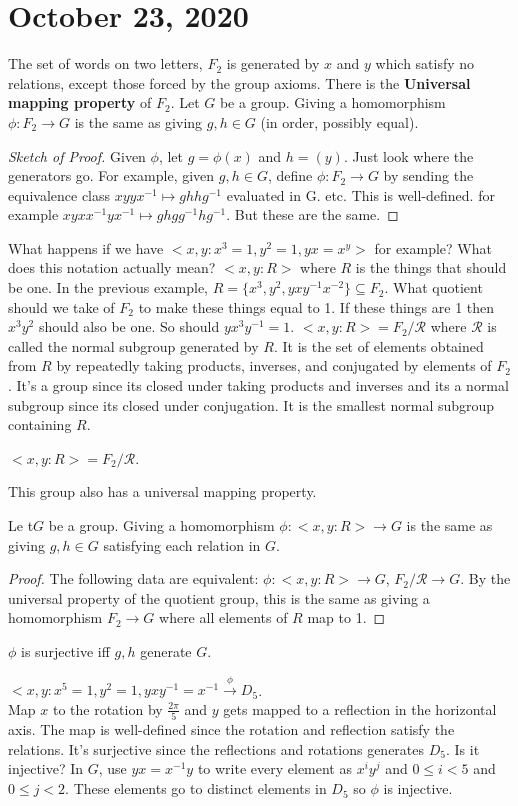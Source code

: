 \documentclass{article}
\newcommand{\vocab}[1]{\textbf{\color{blue!90}\boldmath #1}}
\newcommand{\ra}[1][]{\xrightarrow{#1}}
\begin{document}
\section{October 23, 2020}
The set of words on two letters, $F_2$ is generated by $x$ and $y$ which satisfy no relations, except those forced by the group axioms. There is the \vocab{Universal mapping property} of $F_2$. Let $G$ be a group. Giving a homomorphism $\phi:F_2\ra G$ is the same as giving $g,h\in G$ (in order, possibly equal).
\begin{proof}[Sketch of Proof]
Given $\phi$, let $g=\phi(x)$ and $h=(y)$. Just look where the generators go. For example, given $g,h\in G$, define $\phi:F_2\ra G$ by sending the equivalence class $xyyx^{-1}\mapsto ghhg^{-1}$ evaluated in G. etc. This is well-defined. for example $xyxx^{-1}yx^{-1}\mapsto ghgg^{-1}hg^{-1}$. But these are the same.  
\end{proof}
What happens if we have $<x,y:x^3=1,y^2=1,yx=x^y>$ for example? What does this notation actually mean?  $<x,y:R>$ where $R$ is the things that should be one. In the previous example, $R=\{x^3,y^2,yxy^{-1}x^{-2}\}\subseteq F_2$. What quotient should we take of $F_2$ to make these things equal to 1. If these things are 1 then $x^3y^2$ should also be one. So should $yx^3y^{-1}=1$. $<x,y:R>=F_2/\mathcal{R}$ where $\mathcal{R}$ is called the normal subgroup generated by $R$. It is the set of elements obtained from $R$ by repeatedly taking products, inverses, and conjugated by elements of $F_2$. It's a group since its closed under taking products and inverses and its a normal subgroup since its closed under conjugation. It is the smallest normal subgroup containing $R$.
\begin{definition}
$<x,y:R>=F_2/\mathcal{R}$.
\end{definition}
This group also has a universal mapping property. 
\begin{definition}
Le t$G$ be a group. Giving a homomorphism $\phi:<x,y:R>\ra G$ is the same as giving $g,h\in G$ satisfying each relation in $G$.
\end{definition}
\begin{proof}
The following data are equivalent: $\phi:<x,y:R>\ra G$, $F_2/\mathcal{R}\ra G$. By the universal property of the quotient group, this is the same as giving a homomorphism $F_2\ra G$ where all  elements of $R$ map to 1.
\end{proof}
$\phi$ is surjective iff $g,h$ generate $G$.
\begin{example}
$<x,y:x^5=1,y^2=1,yxy^{-1}=x^{-1}\ra[\phi]D_5$.\\
Map $x$ to the rotation by $\frac{2\pi}{5}$ and $y$ gets mapped to a reflection in the horizontal axis. The map is well-defined since the rotation and reflection satisfy the relations. It's surjective since the reflections and rotations generates $D_5$. Is it injective? In $G$, use $yx=x^{-1}y$ to write every element as $x^iy^j$ and $0\leq i<5$ and $0\leq j<2$. These elements go to distinct elements in $D_5$ so $\phi$ is injective.
\end{example}
\end{document}
